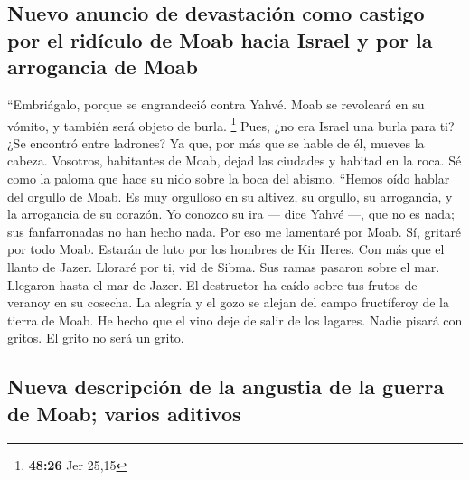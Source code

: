 \hypertarget{nuevo-anuncio-de-devastaciuxf3n-como-castigo-por-el-riduxedculo-de-moab-hacia-israel-y-por-la-arrogancia-de-moab}{%
\subsection{Nuevo anuncio de devastación como castigo por el ridículo de
Moab hacia Israel y por la arrogancia de
Moab}\label{nuevo-anuncio-de-devastaciuxf3n-como-castigo-por-el-riduxedculo-de-moab-hacia-israel-y-por-la-arrogancia-de-moab}}

 ``Embriágalo, porque se engrandeció contra Yahvé. Moab
se revolcará en su vómito, y también será objeto de burla. \footnote{\textbf{48:26}
  Jer 25,15}  Pues, ¿no era Israel una burla para ti? ¿Se
encontró entre ladrones? Ya que, por más que se hable de él, mueves la
cabeza.  Vosotros, habitantes de Moab, dejad las ciudades
y habitad en la roca. Sé como la paloma que hace su nido sobre la boca
del abismo.  ``Hemos oído hablar del orgullo de Moab. Es
muy orgulloso en su altivez, su orgullo, su arrogancia, y la arrogancia
de su corazón.  Yo conozco su ira --- dice Yahvé ---, que
no es nada; sus fanfarronadas no han hecho nada.  Por eso
me lamentaré por Moab. Sí, gritaré por todo Moab. Estarán de luto por
los hombres de Kir Heres.  Con más que el llanto de
Jazer. Lloraré por ti, vid de Sibma. Sus ramas pasaron sobre el mar.
Llegaron hasta el mar de Jazer. El destructor ha caído sobre tus frutos
de veranoy en su cosecha.  La alegría y el gozo se alejan
del campo fructíferoy de la tierra de Moab. He hecho que el vino deje de
salir de los lagares. Nadie pisará con gritos. El grito no será un
grito.

\hypertarget{nueva-descripciuxf3n-de-la-angustia-de-la-guerra-de-moab-varios-aditivos}{%
\subsection{Nueva descripción de la angustia de la guerra de Moab;
varios
aditivos}\label{nueva-descripciuxf3n-de-la-angustia-de-la-guerra-de-moab-varios-aditivos}}

